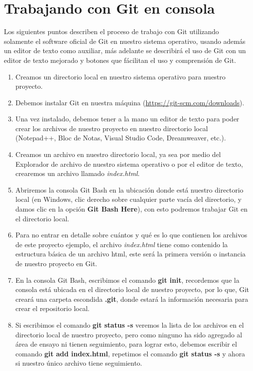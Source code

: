 \section{Trabajando con Git en consola}
\hspace{0.55cm}Los siguientes puntos describen el proceso de trabajo con Git utilizando solamente el software oficial de Git en nuestro sistema operativo, usando además un editor de texto como auxiliar, más adelante se describirá el uso de Git con un editor de texto mejorado y botones que fácilitan el uso y comprensión de Git.
\begin{enumerate}
    \item Creamos un directorio local en nuestro sistema operativo para nuestro proyecto.
    \item Debemos instalar Git en nuestra máquina (\underline{https://git-scm.com/downloads}).
    \item Una vez instalado, debemos tener a la mano un editor de texto para poder crear los archivos de nuestro proyecto en nuestro directorio local (Notepad++, Bloc de Notas, Visual Studio Code, Dreamweaver, etc.).
    \item Creamos un archivo en nuestro directorio local, ya sea por medio del Explorador de archivo de nuestro sistema operativo o por el editor de texto, crearemos un archivo llamado \textit{index.html}.
    \item Abriremos la consola Git Bash en la ubicación donde está nuestro directorio local (en Windows, clic derecho sobre cualquier parte vacía del directorio, y damos clic en la opción \textbf{Git Bash Here}), con esto podremos trabajar Git en el directorio local.
    \item Para no entrar en detalle sobre cuántos y qué es lo que contienen los archivos de este proyecto ejemplo, el archivo \textit{index.html} tiene como contenido la estructura básica de un archivo html, este será la primera versión o instancia de nuestro proyecto en Git.
    \item En la consola Git Bash, escribimos el comando \textbf{git init}, recordemos que la consola está ubicada en el directorio local de nuestro proyecto, por lo que, Git creará una carpeta escondida \textbf{.git}, donde estará la información necesaria para crear el repositorio local.
    \item Si escribimos el comando \textbf{git status -s} veremos la lista de los archivos en el directorio local de nuestro proyecto, pero como ninguno ha sido agregado al área de ensayo ni tienen seguimiento, para lograr esto, debemos escribir el comando \textbf{git add index.html}, repetimos el comando \textbf{git status -s} y ahora si nuestro único archivo tiene seguimiento.

\end{enumerate}
